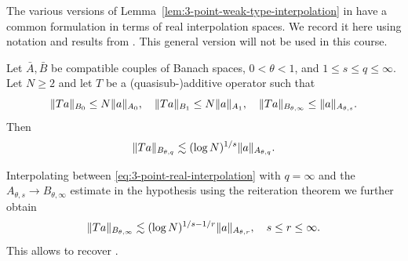 The various versions of Lemma~\ref{lem:3-point-weak-type-interpolation} in \cite{MR1261427,MR1681088,MR2680067} have a common formulation in terms of real interpolation spaces.
We record it here using notation and results from \cite{MR0482275}.
This general version will not be used in this course.
\begin{lemma}
\label{lem:3-point-real-interpolation}
Let $\bar{A}, \bar{B}$ be compatible couples of Banach spaces, $0 < \theta < 1$, and $1\leq s \leq q \leq \infty$.
Let $N\geq 2$ and let $T$ be a (quasisub-)additive operator such that
\[
\lVert Ta\rVert_{B_{0}} \leq N \lVert a\rVert_{A_{0}},
\quad
\lVert Ta\rVert_{B_{1}} \leq N \lVert a\rVert_{A_{1}},
\quad
\lVert Ta\rVert_{B_{\theta,\infty}} \leq \lVert a\rVert_{A_{\theta,s}}.
\]
Then
\begin{equation}
\label{eq:3-point-real-interpolation}
\lVert Ta\rVert_{B_{\theta,q}} \lesssim (\log N)^{1/s} \lVert a\rVert_{A_{\theta,q}}.
\end{equation}
\end{lemma}
Interpolating between \eqref{eq:3-point-real-interpolation} with $q=\infty$ and the $A_{\theta,s} \to B_{\theta,\infty}$ estimate in the hypothesis using the reiteration theorem we further obtain
\begin{equation}
\label{eq:3-point-real-interpolation:r->infty}
\lVert Ta\rVert_{B_{\theta,\infty}} \lesssim (\log N)^{1/s-1/r} \lVert a\rVert_{A_{\theta,r}},
\quad
s \leq r \leq \infty.
\end{equation}
This allows to recover \cite[Proposition 5(i)]{MR1261427}.

